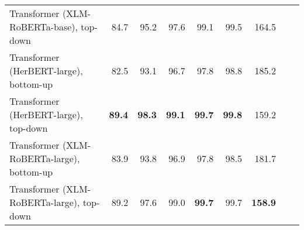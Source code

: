 \begin{table}[ht!]
{\begin{tabular}{lrrrrrrrr}
  Transformer (XLM-RoBERTa-base), top-down & 84.7 & 95.2 & 97.6 & 99.1 & 99.5 & 164.5 \\ 
  Transformer (HerBERT-large), bottom-up & 82.5 & 93.1 & 96.7 & 97.8 & 98.8 & 185.2 \\ 
  Transformer (HerBERT-large), top-down & \textbf{89.4} & \textbf{98.3} & \textbf{99.1} & \textbf{99.7} & \textbf{99.8} & 159.2 \\ 
  Transformer (XLM-RoBERTa-large), bottom-up & 83.9 & 93.8 & 96.9 & 97.8 & 98.5 & 181.7 \\ 
  Transformer (XLM-RoBERTa-large), top-down & 89.2 & 97.6 & 99.0 & \textbf{99.7} & 99.7 & \textbf{158.9} \\ 
   \hline
\end{tabular}
}
\end{table}




